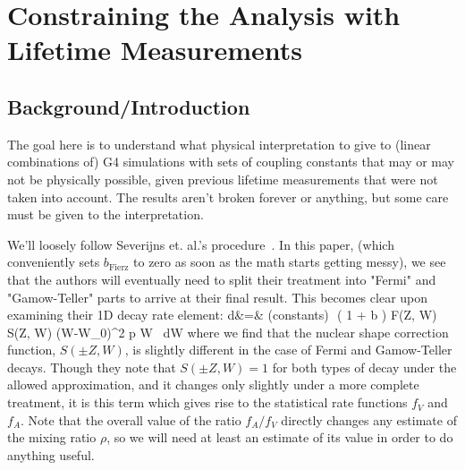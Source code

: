 


\chapter[How To Lifetime]{Constraining the Analysis with Lifetime Measurements}
\section[Intro]{Background/Introduction}

The goal here is to understand what physical interpretation to give to (linear combinations of) G4 simulations with sets of coupling constants that may or may not be physically possible, given previous lifetime measurements that were not taken into account.  The results aren't broken forever or anything, but some care must be given to the interpretation.  

We'll loosely follow Severijns et. al.'s procedure~\cite{SeverijnsTandecki2008}.  In this paper, (which conveniently sets $b_{\mathrm{Fierz}}$ to zero as soon as the math starts getting messy), we see that the authors will eventually need to split their treatment into "Fermi" and "Gamow-Teller" parts to arrive at their final result.  This becomes clear upon examining their 1D decay rate element:
\bea
d\Gamma &=& (\textrm{constants})\,\, \xi \left( 1 +  b \right) F(\pm Z, W) S(\pm Z, W) (W-W_0)^2 p W \, dW
\eea
where we find that the nuclear shape correction function, $S(\pm Z, W)$, is slightly different in the case of Fermi and Gamow-Teller decays.  Though they note that $S(\pm Z, W)=1$ for both types of decay under the allowed approximation, and it changes only slightly under a more complete treatment, it is this term which gives rise to the statistical rate functions $f_V$ and $f_A$.  Note that the overall value of the ratio $f_A/f_V$ directly changes any estimate of the mixing ratio $\rho$, so we will need at least an estimate of its value in order to do anything useful.  

